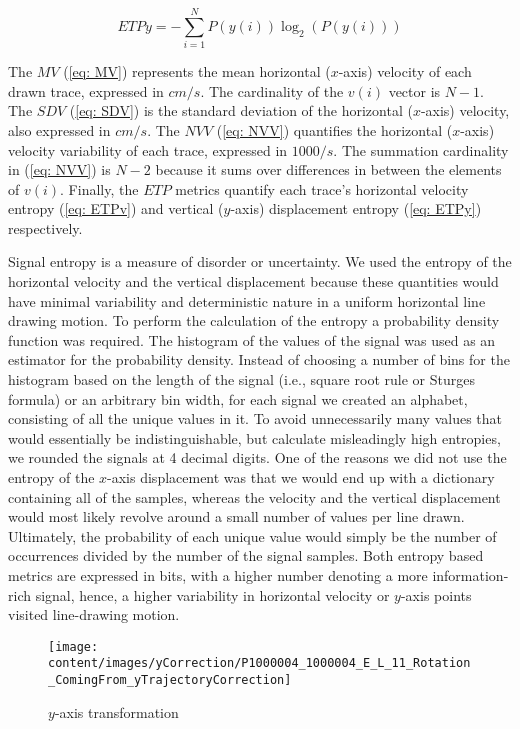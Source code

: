 \begin{equation} \label{eq: ETPy}
ETPy = -\sum_{i=1}^{N}P(y(i))\log_{2}(P(y(i)))
\end{equation}

\noindent
The $MV$ (\ref{eq: MV}) represents the mean horizontal ($x$-axis) velocity of each drawn trace, expressed in $cm/s$. The cardinality of the $v(i)$ vector is $N-1$. The $SDV$ (\ref{eq: SDV}) is the standard deviation of the horizontal ($x$-axis) velocity, also expressed in $cm/s$. The $NVV$ (\ref{eq: NVV}) quantifies the horizontal ($x$-axis) velocity variability of each trace, expressed in $1000/s$. The summation cardinality in (\ref{eq: NVV}) is $N-2$ because it sums over differences in between the elements of $v(i)$. Finally, the $ETP$ metrics quantify each trace's horizontal velocity entropy (\ref{eq: ETPv}) and vertical ($y$-axis) displacement entropy (\ref{eq: ETPy}) respectively. 

Signal entropy is a measure of disorder or uncertainty. We used the entropy of the horizontal velocity and the vertical displacement because these quantities would have minimal variability and deterministic nature in a uniform horizontal line drawing motion. To perform the calculation of the entropy a probability density function was required. The histogram of the values of the signal was used as an estimator for the probability density. Instead of choosing a number of bins for the histogram based on the length of the signal (i.e., square root rule or Sturges formula) or an arbitrary bin width, for each signal we created an alphabet, consisting of all the unique values in it. To avoid unnecessarily many values that would essentially be indistinguishable, but calculate misleadingly high entropies, we rounded the signals at 4 decimal digits. One of the reasons we did not use the entropy of the $x$-axis displacement was that we would end up with a dictionary containing all of the samples, whereas the velocity and the vertical displacement would most likely revolve around a small number of values per line drawn. Ultimately, the probability of each unique value would simply be the number of occurrences divided by the number of the signal samples. Both entropy based metrics are expressed in bits, with a higher number denoting a more information-rich signal, hence, a higher variability in horizontal velocity or $y$-axis points visited line-drawing motion. 

\begin{figure}[h]
\centering
  \texttt{[image: content/images/yCorrection/P1000004\_1000004\_E\_L\_11\_Rotation\_ComingFrom\_yTrajectoryCorrection]}
\caption{$y$-axis transformation}
\label{fig:yCorrection}
\end{figure}

